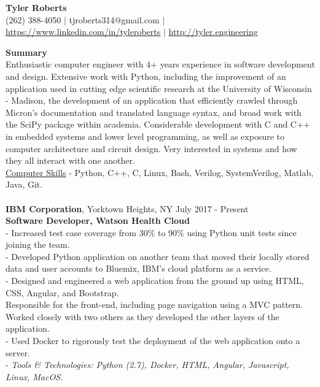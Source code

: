 \documentclass{resume}
\begin{document}
\begin{center}
{\LARGE \bf Tyler Roberts} \\[1mm]
\footnotesize
(262) 388-4050 $|$
tjroberts314@gmail.com $|$
\href{https://www.linkedin.com/in/tyleroberts}{https://www.linkedin.com/in/tyleroberts} $|$
\href{http://tyler.engineering}{http://tyler.engineering}
\end{center}
\begin{flushleft}

{\textbf{\large Summary}} \\
{
\footnotesize
\tab Enthusiastic computer engineer with 4+ years experience in software development and design. Extensive work with Python, including the improvement of an application used in cutting edge scientific research at the University of Wisconsin - Madison, the development of an application that efficiently crawled through Micron's documentation and translated language syntax, and broad work with the SciPy package within academia. Considerable development with C and C++ in embedded systems and lower level programming, as well as exposure to computer architecture and circuit design. Very interested in systems and how they all interact with one another. \\[2mm]
}
\underline{Computer Skills} - Python, C++, C, Linux, Bash, Verilog, SystemVerilog, Matlab, Java, Git. \\[5mm]
\\[2mm]

\textbf{IBM Corporation}, Yorktown Heights, NY \hfill July 2017 - Present\\
\textbf{Software Developer, Watson Health Cloud}\\
{\footnotesize
	\ttab- Increased test case coverage from 30\% to 90\% using Python unit tests since joining the team. \\
	\ttab- Developed Python application on another team that moved their locally stored data and user accounts to Bluemix,
	\ttab IBM's cloud platform as a service. \\
	\ttab- Designed and engineered a web application from the ground up using HTML, CSS, Angular, and Bootstrap. \\
	\ttab Responsible for the front-end, including page navigation using a MVC pattern.  Worked closely with two others as they
	\ttab developed the other layers of the application. \\
	\ttab - Used Docker to rigorously test the deployment of the web application onto a server. \\
	\ttab- \textit{Tools \& Technologies: Python (2.7), Docker, HTML, Angular, Javascript, Linux, MacOS.}\\[3mm]
}


\end{flushleft}
\end{document}
